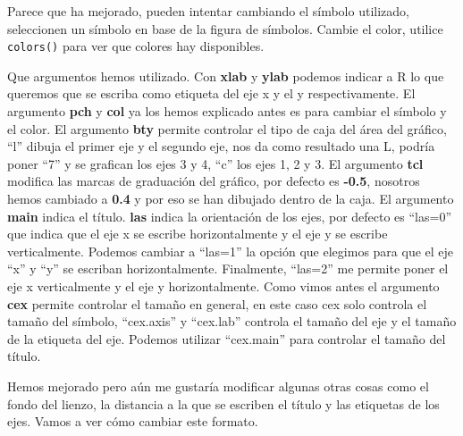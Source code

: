 \documentclass[]{article}
\begin{document}
Parece que ha mejorado, pueden intentar cambiando el símbolo utilizado,
seleccionen un símbolo en base de la figura de símbolos. Cambie el
color, utilice \texttt{colors()} para ver que colores hay disponibles.

Que argumentos hemos utilizado. Con \textbf{xlab} y \textbf{ylab}
podemos indicar a R lo que queremos que se escriba como etiqueta del eje
x y el y respectivamente. El argumento \textbf{pch} y \textbf{col} ya
los hemos explicado antes es para cambiar el símbolo y el color. El
argumento \textbf{bty} permite controlar el tipo de caja del área del
gráfico, ``l'' dibuja el primer eje y el segundo eje, nos da como
resultado una L, podría poner ``7'' y se grafican los ejes 3 y 4, ``c''
los ejes 1, 2 y 3. El argumento \textbf{tcl} modifica las marcas de
graduación del gráfico, por defecto es \textbf{-0.5}, nosotros hemos
cambiado a \textbf{0.4} y por eso se han dibujado dentro de la caja. El
argumento \textbf{main} indica el título. \textbf{las} indica la
orientación de los ejes, por defecto es ``las=0'' que indica que el eje
x se escribe horizontalmente y el eje y se escribe verticalmente.
Podemos cambiar a ``las=1'' la opción que elegimos para que el eje ``x''
y ``y'' se escriban horizontalmente. Finalmente, ``las=2'' me permite
poner el eje x verticalmente y el eje y horizontalmente. Como vimos
antes el argumento \textbf{cex} permite controlar el tamaño en general,
en este caso cex solo controla el tamaño del símbolo, ``cex.axis'' y
``cex.lab'' controla el tamaño del eje y el tamaño de la etiqueta del
eje. Podemos utilizar ``cex.main'' para controlar el tamaño del título.

Hemos mejorado pero aún me gustaría modificar algunas otras cosas como
el fondo del lienzo, la distancia a la que se escriben el título y las
etiquetas de los ejes. Vamos a ver cómo cambiar este formato.
\end{document}
